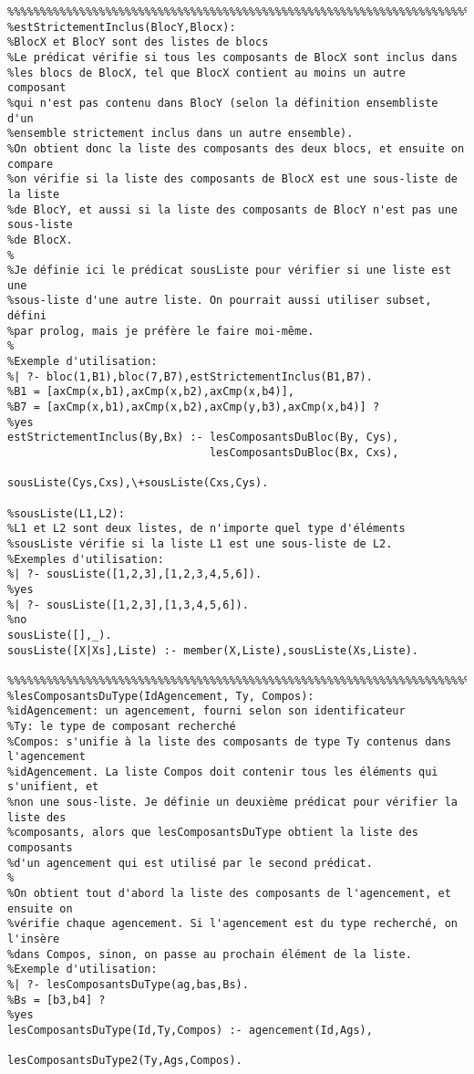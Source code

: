 \documentclass[letterpaper,11pt]{letter}
\begin{document}
\begin{verbatim}
%%%%%%%%%%%%%%%%%%%%%%%%%%%%%%%%%%%%%%%%%%%%%%%%%%%%%%%%%%%%%%%%%%%%%%%%%%%%%%%
%estStrictementInclus(BlocY,Blocx):
%BlocX et BlocY sont des listes de blocs
%Le prédicat vérifie si tous les composants de BlocX sont inclus dans
%les blocs de BlocX, tel que BlocX contient au moins un autre composant
%qui n'est pas contenu dans BlocY (selon la définition ensembliste d'un
%ensemble strictement inclus dans un autre ensemble).
%On obtient donc la liste des composants des deux blocs, et ensuite on compare
%on vérifie si la liste des composants de BlocX est une sous-liste de la liste
%de BlocY, et aussi si la liste des composants de BlocY n'est pas une sous-liste
%de BlocX.
%
%Je définie ici le prédicat sousListe pour vérifier si une liste est une 
%sous-liste d'une autre liste. On pourrait aussi utiliser subset, défini
%par prolog, mais je préfère le faire moi-même.
%
%Exemple d'utilisation:
%| ?- bloc(1,B1),bloc(7,B7),estStrictementInclus(B1,B7).
%B1 = [axCmp(x,b1),axCmp(x,b2),axCmp(x,b4)],
%B7 = [axCmp(x,b1),axCmp(x,b2),axCmp(y,b3),axCmp(x,b4)] ? 
%yes
estStrictementInclus(By,Bx) :- lesComposantsDuBloc(By, Cys),
                               lesComposantsDuBloc(Bx, Cxs),
                               sousListe(Cys,Cxs),\+sousListe(Cxs,Cys).

%sousListe(L1,L2):
%L1 et L2 sont deux listes, de n'importe quel type d'éléments
%sousListe vérifie si la liste L1 est une sous-liste de L2.
%Exemples d'utilisation:
%| ?- sousListe([1,2,3],[1,2,3,4,5,6]).
%yes
%| ?- sousListe([1,2,3],[1,3,4,5,6]).
%no
sousListe([],_).
sousListe([X|Xs],Liste) :- member(X,Liste),sousListe(Xs,Liste).

%%%%%%%%%%%%%%%%%%%%%%%%%%%%%%%%%%%%%%%%%%%%%%%%%%%%%%%%%%%%%%%%%%%%%%%%%%%%%%%
%lesComposantsDuType(IdAgencement, Ty, Compos):
%idAgencement: un agencement, fourni selon son identificateur
%Ty: le type de composant recherché
%Compos: s'unifie à la liste des composants de type Ty contenus dans l'agencement
%idAgencement. La liste Compos doit contenir tous les éléments qui s'unifient, et
%non une sous-liste. Je définie un deuxième prédicat pour vérifier la liste des
%composants, alors que lesComposantsDuType obtient la liste des composants
%d'un agencement qui est utilisé par le second prédicat.
%
%On obtient tout d'abord la liste des composants de l'agencement, et ensuite on
%vérifie chaque agencement. Si l'agencement est du type recherché, on l'insère
%dans Compos, sinon, on passe au prochain élément de la liste.
%Exemple d'utilisation:
%| ?- lesComposantsDuType(ag,bas,Bs).
%Bs = [b3,b4] ? 
%yes
lesComposantsDuType(Id,Ty,Compos) :- agencement(Id,Ags),
                                     lesComposantsDuType2(Ty,Ags,Compos).



\end{verbatim}
\end{document}
